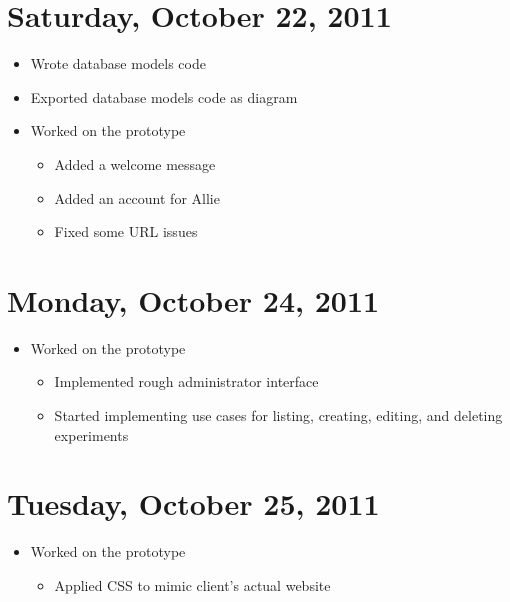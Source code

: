 \documentclass{article}
\begin{document}
\section{Saturday, October 22, 2011}
\begin{itemize}
\item Wrote database models code
\item Exported database models code as diagram
\item Worked on the prototype
    \begin{itemize}
    \item Added a welcome message
    \item Added an account for Allie
    \item Fixed some URL issues
    \end{itemize}
\end{itemize}

\section{Monday, October 24, 2011}
\begin{itemize}
\item Worked on the prototype
    \begin{itemize}
    \item Implemented rough administrator interface
    \item Started implementing use cases for listing, creating, editing, and deleting experiments
    \end{itemize}
\end{itemize}

\section{Tuesday, October 25, 2011}
\begin{itemize}
\item Worked on the prototype
    \begin{itemize}
    \item Applied CSS to mimic client's actual website
    \end{itemize}
\end{itemize}
\end{document}
